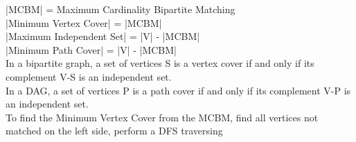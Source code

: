 |MCBM| = Maximum Cardinality Bipartite Matching \\
|Minimum Vertex Cover| = |MCBM| \\ 
|Maximum Independent Set| = |V| - |MCBM| \\ 
|Minimum Path Cover| = |V| - |MCBM| \\ 
In a bipartite graph, a set of vertices S is a vertex cover if and only if its complement V-S is an independent set. \\ 
In a DAG, a set of vertices P is a path cover if and only if its complement V-P is an independent set. \\ 
To find the Minimum Vertex Cover from the MCBM, find all vertices not matched on the left side, perform a DFS traversing
